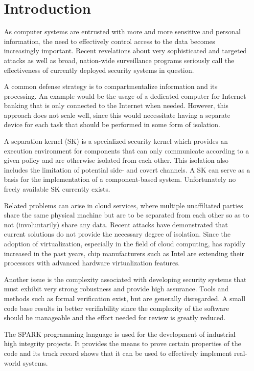 \chapter{Introduction}
As computer systems are entrusted with more and more sensitive and personal
information, the need to effectively control access to the data becomes
increasingly important. Recent revelations about very sophisticated and
targeted attacks as well as broad, nation-wide surveillance programs seriously
call the effectiveness of currently deployed security systems in question.

A common defense strategy is to compartmentalize information and its processing.
An example would be the usage of a dedicated computer for Internet banking that
is only connected to the Internet when needed. However, this approach does not
scale well, since this would necessitate having a separate device for each task
that should be performed in some form of isolation.

A separation kernel (SK) is a specialized security kernel which provides an
execution environment for components that can only communicate according to a
given policy and are otherwise isolated from each other. This isolation also
includes the limitation of potential side- and covert channels. A SK can serve
as a basis for the implementation of a component-based system. Unfortunately no
freely available SK currently exists.

Related problems can arise in cloud services, where multiple unaffiliated parties
share the same physical machine but are to be separated from each other so as to
not (involuntarily) share any data. Recent attacks
\cite{Wu:2012:WHH:2362793.2362802} have demonstrated that current solutions do
not provide the necessary degree of isolation. Since the adoption of
virtualization, especially in the field of cloud computing, has rapidly
increased in the past years, chip manufacturers such as Intel are extending
their processors with advanced hardware virtualization features.

Another issue is the complexity associated with developing security systems
that must exhibit very strong robustness and provide high assurance. Tools and
methods such as formal verification exist, but are generally disregarded. A
small code base results in better verifiability since the complexity of the
software should be manageable and the effort needed for review is greatly
reduced.

The SPARK programming language is used for the development of industrial high
integrity projects. It provides the means to prove certain properties of the
code and its track record \cite{Chapman:2000:IES:369264.369270} shows that it
can be used to effectively implement real-world systems.

